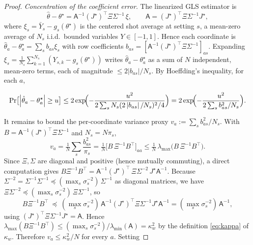 \documentclass[aps,prresearch,reprint,superscriptaddress,nofootinbib,amsmath,amssymb]{revtex4-2}
\newcommand{\abs}[1]{\left\lvert #1 \right\rvert}
\begin{document}
\begin{proof}
\emph{Concentration of the coefficient error.} The linearized GLS estimator is
\begin{equation*}
    \hat\theta-\theta^\star=\mathsf{A}^{-1}(J^\star)^\top\Xi\Sigma^{-1}\,\xi,
    \qquad
    \mathsf{A}=(J^\star)^\top\Xi\Sigma^{-1}J^\star,
\end{equation*}
where $\xi_s=\bar Y_s-g_s(\theta^\star)$ is the centered shot average at setting $s$, a mean-zero average of $N_s$ i.i.d.\ bounded variables $Y\in[-1,1]$. Hence each coordinate is $\hat\theta_a-\theta_a^\star=\sum_s b_{as}\xi_s$ with row coefficients $b_{as}=[\mathsf{A}^{-1}(J^\star)^\top\Xi\Sigma^{-1}]_{as}$. Expanding $\xi_s=\tfrac1{N_s}\sum_{k=1}^{N_s}(Y_{s,k}-g_s(\theta^\star))$ writes $\hat\theta_a-\theta_a^\star$ as a sum of $N$ independent, mean-zero terms, each of magnitude $\leq2\abs{b_{as}}/N_s$. By Hoeffding's inequality, for each $a$,
\begin{widetext}
\begin{equation*}
    \Pr\bigl[\abs{\hat\theta_a-\theta_a^\star}\geq u\bigr]\leq2\exp\!\Bigl(-\frac{u^2}{2\sum_s N_s(2\abs{b_{as}}/N_s)^2/4}\Bigr)=2\exp\!\Bigl(-\frac{u^2}{2\sum_s b_{as}^2/N_s}\Bigr).
\end{equation*}
\end{widetext}
It remains to bound the per-coordinate variance proxy $v_a:=\sum_s b_{as}^2/N_s$. With $B=\mathsf{A}^{-1}(J^\star)^\top\Xi\Sigma^{-1}$ and $N_s=N\pi_s$,
\begin{equation*}
    v_a=\tfrac1N\sum_s\frac{b_{as}^2}{\pi_s}=\tfrac1N\bigl[B\,\Xi^{-1}B^\top\bigr]_{aa}\leq\tfrac1N\,\lambda_{\max}\!\bigl(B\,\Xi^{-1}B^\top\bigr).
\end{equation*}
Since $\Xi,\Sigma$ are diagonal and positive (hence mutually commuting), a direct computation gives $B\Xi^{-1}B^\top=\mathsf{A}^{-1}(J^\star)^\top\,\Xi\Sigma^{-2}\,J^\star\mathsf{A}^{-1}$. Because $\Sigma^{-2}=\Sigma^{-1}\Sigma^{-1}\preceq(\max_s\sigma_s^{-2})\,\Sigma^{-1}$ as diagonal matrices, we have $\Xi\Sigma^{-2}\preceq(\max_s\sigma_s^{-2})\,\Xi\Sigma^{-1}$, so
\begin{equation*}
    B\Xi^{-1}B^\top\ \preceq\ (\max_s\sigma_s^{-2})\,\mathsf{A}^{-1}(J^\star)^\top\Xi\Sigma^{-1}J^\star\mathsf{A}^{-1}=(\max_s\sigma_s^{-2})\,\mathsf{A}^{-1},
\end{equation*}
using $(J^\star)^\top\Xi\Sigma^{-1}J^\star=\mathsf{A}$. Hence $\lambda_{\max}(B\Xi^{-1}B^\top)\leq(\max_s\sigma_s^{-2})/\lambda_{\min}(\mathsf{A})=\kappa_w^2$ by the definition \eqref{eq:kappa} of $\kappa_w$. Therefore $v_a\leq\kappa_w^2/N$ for every $a$. Setting

\end{proof}
\end{document}
